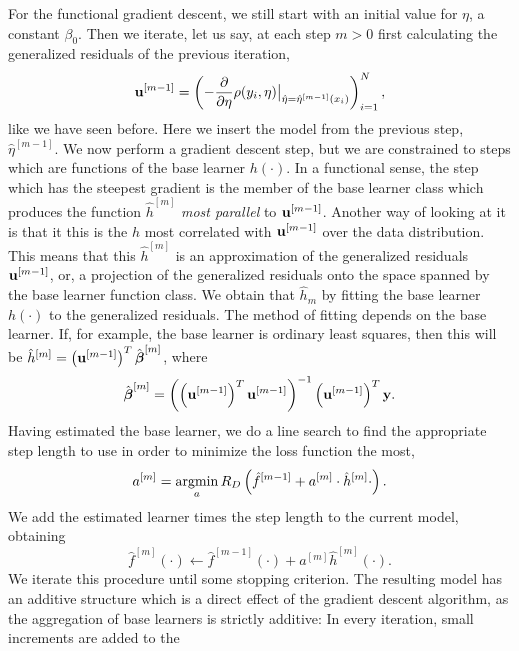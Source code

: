 For the functional gradient descent, we still start with an initial value for $\eta$, a constant $\beta_0$.
Then we iterate, let us say, at each step $m>0$ first calculating the generalized residuals of the previous iteration,
\begin{equation}
    \mathbf{u}^{[m-1]}=\left(-\frac{\partial}{\partial \eta}\rho(y_i, \eta)\big\rvert_{\hat{\eta}=\hat{\eta}^{[m-1]}(x_i)}\right)_{i=1}^N,
\end{equation}
like we have seen before. Here we insert the model from the previous step, $\hat{\eta}^{[m-1]}$.
We now perform a gradient descent step, but we are constrained to steps which are functions of the base learner $h(\cdot)$.
In a functional sense, the step which has the steepest gradient is the member of the base learner class which produces the
function $\hat{h}^{[m]}$ \textit{most parallel} to $\mathbf{u}^{[m-1]}$. Another way of looking at it is that it this is the $h$ most 
correlated with $\mathbf{u}^{[m-1]}$ over the data distribution.
This means that this $\hat{h}^{[m]}$ is an approximation of the generalized residuals $\mathbf{u}^{[m-1]}$, or, a projection of the generalized residuals onto the space spanned by the base learner function class.
We obtain that $\hat{h}_m$ by fitting the base learner $h(\cdot)$ to the generalized residuals.
The method of fitting depends on the base learner. If, for example, the base learner is ordinary least squares, then this will be $\hat{h}^{[m]}=\left(\mathbf{u}^{[m-1]}\right)^T\hat{\boldsymbol{\beta}}^{[m]}$, where
\begin{equation}
    \hat{\boldsymbol{\beta}}^{[m]}=\left(\left(\mathbf{u}^{[m-1]}\right)^T\mathbf{u}^{[m-1]}\right)^{-1}\left(\mathbf{u}^{[m-1]}\right)^T\mathbf{y}.
\end{equation}
Having estimated the base learner, we do a line search to find the appropriate step length to use in order to minimize the loss function the most,
\begin{equation}
    a^{[m]}=\operatorname*{argmin}_{a}R_D\left(\hat{f}^{[m-1]}+a^{[m]}\cdot\hat{h}^{[m]}{\cdot}\right).
\end{equation}
We add the estimated learner times the step length to the current model, obtaining
\begin{equation}
    \hat{f}^{[m]}(\cdot)\gets \hat{f}^{[m-1]}(\cdot)+a^{[m]}\hat{h}^{[m]}(\cdot).
\end{equation}
We iterate this procedure until some stopping criterion. The resulting model has an additive structure which is a direct effect of the
gradient descent algorithm, as the aggregation of base learners is strictly additive: In every iteration, small increments are added to the
